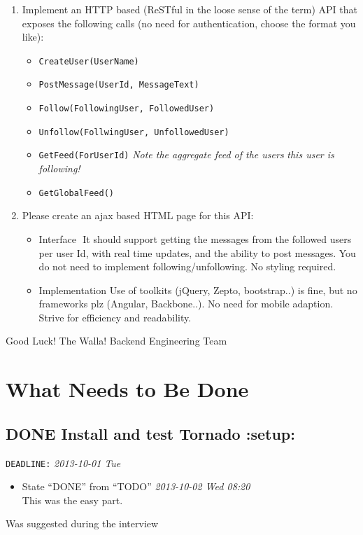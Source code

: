 \documentclass[11pt]{article}
\begin{document}
\begin{enumerate}
\item Implement an HTTP based (ReSTful in the loose sense of the
       term) API that exposes the following calls (no need for
       authentication, choose the format you like):
\begin{itemize}
\item \texttt{CreateUser(UserName)}
\item \texttt{PostMessage(UserId, MessageText)}
\item \texttt{Follow(FollowingUser, FollowedUser)}
\item \texttt{Unfollow(FollwingUser, UnfollowedUser)}
\item \texttt{GetFeed(ForUserId)} \emph{Note the aggregate feed of the users}
         \emph{this user is following!}
\item \texttt{GetGlobalFeed()}
\end{itemize}
\item Please create an ajax based HTML page for this API:
\begin{itemize}
\item Interface ​
         It should support getting the messages from the followed
         users per user Id, with real time updates, and the ability to
         post messages. You do not need to implement
         following/unfollowing. No styling required.
\item Implementation
         Use of toolkits (jQuery, Zepto, bootstrap..) is fine, but no
         frameworks plz (Angular, Backbone..). No need for mobile
         adaption. Strive for efficiency and readability.
\end{itemize}
\end{enumerate}
         
    Good Luck!
    The Walla! Backend Engineering Team
\section{What Needs to Be Done}
\label{sec-2}
\subsection{\textbf{DONE} Install and test Tornado \textbf{:setup:}}
\label{sec-2-1}

   \texttt{DEADLINE:} \textit{2013-10-01 Tue}

\begin{itemize}
\item State ``DONE''       from ``TODO''       \textit{2013-10-02 Wed 08:20} \\
This was the easy part.
\end{itemize}
   Was suggested during the interview
\end{document}
